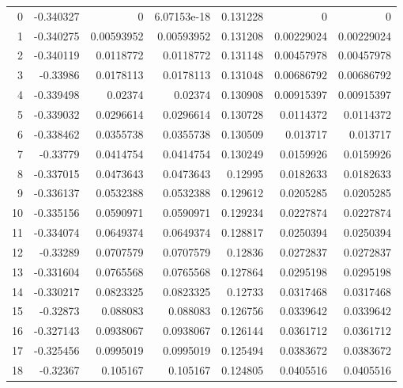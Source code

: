 \begin{tabular}{rrrrrrr}
\hline
   0 & -0.340327    & 0           & 6.07153e-18 &  0.131228    & 0           & 0           \\
   1 & -0.340275    & 0.00593952  & 0.00593952  &  0.131208    & 0.00229024  & 0.00229024  \\
   2 & -0.340119    & 0.0118772   & 0.0118772   &  0.131148    & 0.00457978  & 0.00457978  \\
   3 & -0.33986     & 0.0178113   & 0.0178113   &  0.131048    & 0.00686792  & 0.00686792  \\
   4 & -0.339498    & 0.02374     & 0.02374     &  0.130908    & 0.00915397  & 0.00915397  \\
   5 & -0.339032    & 0.0296614   & 0.0296614   &  0.130728    & 0.0114372   & 0.0114372   \\
   6 & -0.338462    & 0.0355738   & 0.0355738   &  0.130509    & 0.013717    & 0.013717    \\
   7 & -0.33779     & 0.0414754   & 0.0414754   &  0.130249    & 0.0159926   & 0.0159926   \\
   8 & -0.337015    & 0.0473643   & 0.0473643   &  0.12995     & 0.0182633   & 0.0182633   \\
   9 & -0.336137    & 0.0532388   & 0.0532388   &  0.129612    & 0.0205285   & 0.0205285   \\
  10 & -0.335156    & 0.0590971   & 0.0590971   &  0.129234    & 0.0227874   & 0.0227874   \\
  11 & -0.334074    & 0.0649374   & 0.0649374   &  0.128817    & 0.0250394   & 0.0250394   \\
  12 & -0.33289     & 0.0707579   & 0.0707579   &  0.12836     & 0.0272837   & 0.0272837   \\
  13 & -0.331604    & 0.0765568   & 0.0765568   &  0.127864    & 0.0295198   & 0.0295198   \\
  14 & -0.330217    & 0.0823325   & 0.0823325   &  0.12733     & 0.0317468   & 0.0317468   \\
  15 & -0.32873     & 0.088083    & 0.088083    &  0.126756    & 0.0339642   & 0.0339642   \\
  16 & -0.327143    & 0.0938067   & 0.0938067   &  0.126144    & 0.0361712   & 0.0361712   \\
  17 & -0.325456    & 0.0995019   & 0.0995019   &  0.125494    & 0.0383672   & 0.0383672   \\
  18 & -0.32367     & 0.105167    & 0.105167    &  0.124805    & 0.0405516   & 0.0405516   \\

\end{tabular}
